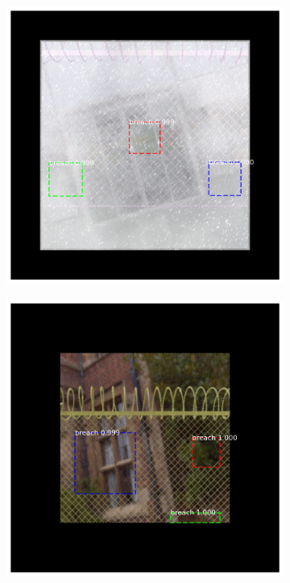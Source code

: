 \documentclass[../Head/Main.tex]{subfiles}
\begin{document}
\begin{figure}[H]
\begin{subfigure}{.24\textwidth}
        \caption{}
    \end{subfigure}
    \hfill
    \begin{subfigure}{.24\textwidth}
        \centering
        \includegraphics[width=\textwidth]{../Figures/rcnn_results/found_breaches/good_performance/14.png}
        \caption{}
    \end{subfigure}
    \hfill
    \begin{subfigure}{.24\textwidth}
        \centering
        \includegraphics[width=\textwidth]{../Figures/rcnn_results/found_breaches/good_performance/17.png}

\end{subfigure}
\end{figure}
\end{document}
